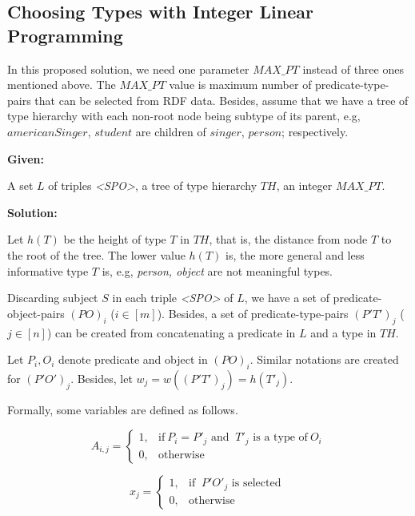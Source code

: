 \documentclass{acm_proc_article-sp}
\begin{document}
\subsection{Choosing Types with Integer Linear Programming}

In this proposed solution, we need one parameter $MAX\_PT$ instead of three ones mentioned above. The $MAX\_PT$ value is maximum number of predicate-type-pairs that can be selected from RDF data. Besides, assume that we have a tree of type hierarchy with each non-root node being subtype of its parent, e.g, $americanSinger$, $student$ are children of $singer$, $person$; respectively.

\textbf{Given:}

A set $L$ of triples \textit{<SPO>}, a tree of type hierarchy $TH$, an integer $MAX\_PT$.

\textbf{Solution:}

Let $h(T)$ be the height of type $T$ in $TH$, that is, the distance from node $T$ to the root of the tree. The lower value $h(T)$ is, the more general and less informative type $T$ is, e.g, \textit{person, object} are not meaningful types.

Discarding subject $S$ in each triple \textit{<SPO>} of $L$, we have a set of predicate-object-pairs $(PO)_{i}$ ($i \in [m]$). Besides, a set of predicate-type-pairs $(P'T')_{j}$ ($j \in [n]$) can be created from concatenating a predicate in $L$ and a type in $TH$.

Let $P_{i}, O_{i}$ denote predicate and object in $(PO)_{i}$. Similar notations are created for $(P'O')_{j}$. Besides, let $w_{j} = w((P'T')_{j}) = h(T'_{j})$.

Formally, some variables are defined as follows.

\begin{equation}
    A_{i,j} =
    \begin{cases}
      1, & \text{if}\ P_{i} = P'_{j}  \text{ and }\ T'_{j} \text{ is a type of}\ O_{i}\\
      0, & \text{otherwise}
    \end{cases}
\end{equation}

\begin{equation}
    x_{j} =
    \begin{cases}
      1, & \text{if }\ P'O'_{j} \text{ is selected}\ \\
      0, & \text{otherwise}
    \end{cases}
\end{equation}
\end{document}

